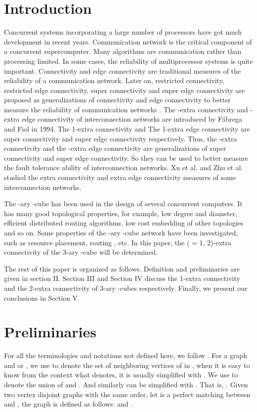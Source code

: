\documentclass[preprint,number,12pt]{elsarticle}
\begin{document}
\section{Introduction}
Concurrent systems  incorporating a large number of processors
have got much development in recent years. Communication network is the critical component of a concurrent supercomputer. Many algorithms are communication rather than processing limited. In some cases,  the
reliability of multiprocessor systems is quite important. Connectivity and edge connectivity are traditional measures of the reliability of a communication network. Later on, restricted connectivity, restricted edge connectivity, super connectivity and super edge connectivity are proposed as generalizations of connectivity and edge connectivity to better measure the reliability of communication networks \cite{Boesch1986-p240-246, Esfahanian1989-p1586-1591, Esfahanian1988-p195-199, Wang2004-p199-205, Wang2008-p587-596, Chen2007-p1848-1855}. The -extra connectivity and -extra edge connectivity of interconnection networks are introduced by F\'abrega and Fiol \cite{F`abrega1994-p163-170} in 1994. The 1-extra connectivity and The 1-extra edge connectivity are super connectivity and super edge connectivity respectively.
Thus, the -extra connectivity and the -extra edge connectivity are generalizations of super connectivity and super edge connectivity. So they can be used to better measure the fault tolerance ability of interconnection networks.
Xu et al.\cite{Xu2007-p222-226} and Zhu et al.\cite{Zhu2006-p111-121} studied the extra connectivity and extra edge connectivity measures of some interconnection networks.

The -ary -cube  has been used in the design of several concurrent computers\cite{Esfahanian1989-p1586-1591, Roth1993-p35-35}.
It has many good topological properties, for example, low degree and diameter, efficient distributed routing algorithms, low cost embedding of other topologies and so on. Some properties of the -ary -cube network have been investigated, such as resource placement, routing \cite{Yoshinaga2004-p49-58}, etc. In this paper, the ( = 1, 2)-extra connectivity of the 3-ary -cube  will be determined.

The rest of this paper is organized as follows. Definition and preliminaries are given in section II. Section III and Section IV discuss the 1-extra connectivity and the 2-extra connectivity of 3-ary -cubes respectively. Finally,  we present our conclusions in Section V.

\section{Preliminaries} \label{S2:Preliminaties}
For all the terminologies and notations not defined here, we
follow \cite{1097029}. For a graph  and 
or , we use   to denote the set of
neighboring vertices  of  in , when it is easy to know
from the context what  denotes, it is usually simplified with
. We use  to denote the union of  and .
And similarly   can be simplified with .
That is, . Given two vertex disjoint graphs  with the same order,
let  is a perfect matching between  and ,
the graph  is defined as follows:  and .
\end{document}
